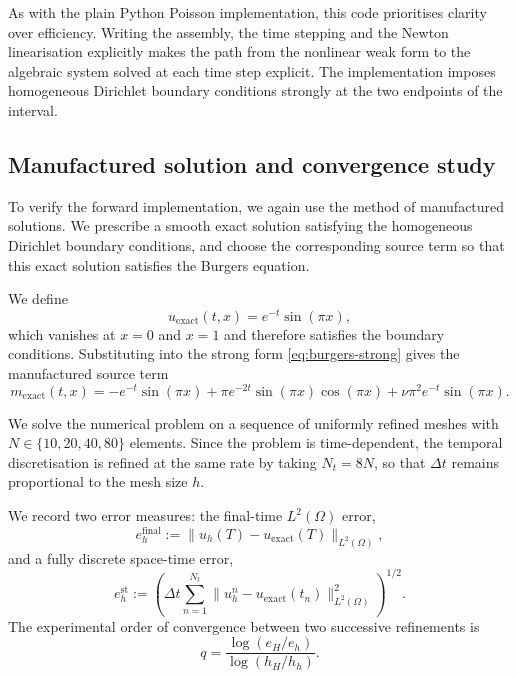 \documentclass[a4paper,11pt]{article}
\newcommand{\Om}{\Omega}
\newcommand{\Lp}[1]{L^{2}(#1)}              %
\theoremstyle{spacedplain} \newtheorem{theorem}[counter]{Theorem} \newtheorem{lemma}[counter]{Lemma} \newtheorem{prop}[counter]{Proposition} \newtheorem{cor}[counter]{Corollary}
\theoremstyle{spaceddefinition} \newtheorem{defn}[counter]{Definition} \newtheorem{example}[counter]{Example} \newtheorem{remark}[counter]{Remark}
\begin{document}
As with the plain Python Poisson implementation, this code prioritises clarity over efficiency. Writing the assembly, the time stepping and the Newton linearisation explicitly makes the path from the nonlinear weak form to the algebraic system solved at each time step explicit. The implementation imposes homogeneous Dirichlet boundary conditions strongly at the two endpoints of the interval.

\subsection{Manufactured solution and convergence study}
\label{sec:burgers-numerics:mms}

To verify the forward implementation, we again use the method of manufactured solutions. We prescribe a smooth exact solution satisfying the homogeneous Dirichlet boundary conditions, and choose the corresponding source term so that this exact solution satisfies the Burgers equation.

We define
\begin{equation}
  u_{\mathrm{exact}}(t, x) = e^{-t} \sin(\pi x),
\end{equation}
which vanishes at $x = 0$ and $x = 1$ and therefore satisfies the boundary conditions. Substituting into the strong form \cref{eq:burgers-strong} gives the manufactured source term
\begin{equation}
  m_{\mathrm{exact}}(t, x)
  = - e^{-t} \sin(\pi x)
  + \pi e^{-2t} \sin(\pi x) \cos(\pi x)
  + \nu \pi^{2} e^{-t} \sin(\pi x).
\end{equation}

We solve the numerical problem on a sequence of uniformly refined meshes with $N \in \{10, 20, 40, 80\}$ elements. Since the problem is time-dependent, the temporal discretisation is refined at the same rate by taking $N_t = 8N$, so that $\Delta t$ remains proportional to the mesh size $h$.

We record two error measures: the final-time $\Lp{\Om}$ error,
\begin{equation}
  e_h^{\mathrm{final}} := \|u_h(T) - u_{\mathrm{exact}}(T)\|_{\Lp{\Om}},
\end{equation}
and a fully discrete space-time error,
\begin{equation}
  e_h^{\mathrm{st}}
  := \left( \Delta t \sum_{n=1}^{N_t}
              \|u_h^n - u_{\mathrm{exact}}(t_n)\|_{\Lp{\Om}}^{2}
        \right)^{1/2}.
\end{equation}
The experimental order of convergence between two successive refinements is
\begin{equation}
  q = \frac{\log(e_H / e_h)}{\log(h_H / h_h)}.
\end{equation}
\end{document}
